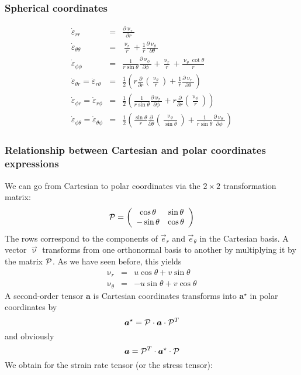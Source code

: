 \subsubsection{Spherical coordinates \label{ss:srsc}}

\begin{eqnarray}
\dot\varepsilon_{rr} 
&=& \frac{\partial \upnu_r}{\partial r} \\
\dot\varepsilon_{\theta\theta} 
&=& \frac{\upnu_r}{r} + \frac{1}{r} \frac{\partial \upnu_\theta}{\partial \theta}  \\
\dot\varepsilon_{\phi\phi} 
&=& \frac{1}{r \sin\theta} \frac{\partial \upnu_\phi}{\partial \phi} +
\frac{\upnu_r}{r} +\frac{\upnu_\theta \cot \theta}{r} \\
\dot\varepsilon_{\theta r} = \dot\varepsilon_{r\theta}   
&=& \frac{1}{2} \left( r \frac{\partial}{\partial r} (\frac{\upnu_\theta}{r} ) 
+\frac{1}{r} \frac{\partial \upnu_r}{\partial \theta} \right) \\
\dot\varepsilon_{\phi r} = \dot\varepsilon_{r\phi}      
&=&  \frac{1}{2} \left(  \frac{1}{r \sin\theta} \frac{\partial \upnu_r}{\partial \phi} 
+ r \frac{\partial }{\partial r} (\frac{\upnu_\phi}{r}) \right)  \\
\dot\varepsilon_{\phi \theta} = \dot\varepsilon_{\theta\phi} 
&=& \frac{1}{2} \left( \frac{\sin \theta}{r} \frac{\partial }{\partial \theta} (\frac{\upnu_\phi}{\sin\theta}) + \frac{1}{r \sin\theta} \frac{\partial \upnu_\theta}{\partial \phi}    \right) 
\end{eqnarray}



\subsubsection{Relationship between Cartesian and polar coordinates expressions}

We can go from Cartesian to polar coordinates  via the $2\times 2$ transformation matrix:
\begin{equation}
{\cal P}=
\left(
\begin{array}{ccc}
\cos\theta & \sin\theta \\
-\sin\theta & \cos\theta
\end{array}
\right)
\end{equation}
The rows correspond to the components of $\vec{e}_r$ and $\vec{e}_\theta$ in the Cartesian basis.
A vector $\vec{\upnu}$ transforms from one orthonormal basis to another by multiplying it by 
the matrix ${\cal P}$. As we have seen before, this yields
\begin{eqnarray}
\upnu_r &=& u \cos\theta + v \sin\theta \\
\upnu_\theta &=& -u \sin\theta + v \cos\theta
\end{eqnarray}
A second-order tensor ${\bm a}$ is Cartesian coordinates transforms into ${\bm a}^\star$
in polar coordinates by 
\[
{\bm a}^\star = {\cal P} \cdot {\bm a} \cdot {\cal P}^T
\]
and obviously 
\[
{\bm a} = {\cal P}^T \cdot {\bm a}^\star \cdot {\cal P}
\]
We obtain for the strain rate tensor (or the stress tensor):

